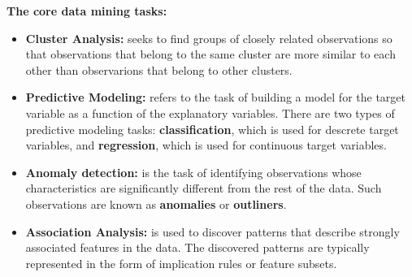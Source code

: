 	{\bf The core data mining tasks:}
	\begin{itemize}
		\item {\bf Cluster Analysis:} seeks to find groups of closely related observations
		so that observations that belong to the same cluster are more similar to each other
		than observarions that belong to other clusters.
		\item {\bf Predictive Modeling:} refers to the task of building a model for the 
		target variable as a function of the explanatory variables. There are two types of 
		predictive modeling tasks: {\bf classification}, which is used for descrete target 
		variables, and {\bf regression}, which is used for continuous target variables. 
		\item {\bf Anomaly detection:} is the task of identifying observations whose 
		characteristics are significantly different from the rest of the data. Such observations
		are known as {\bf anomalies} or {\bf outliners}.
		\item {\bf Association Analysis:} is used to discover patterns that describe strongly
		associated features in the data. The discovered patterns are typically represented in the 
		form of implication rules or feature subsets. 
	\end{itemize}

